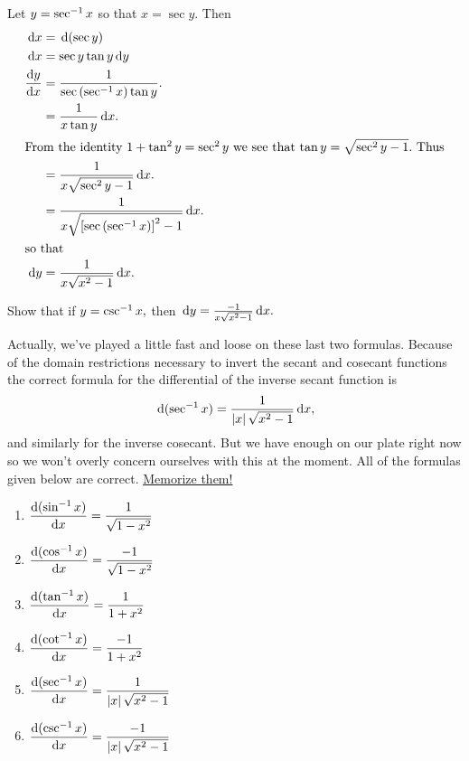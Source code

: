 Let $y=\sec^{-1} x$ so that $x=\sec y.$ Then
\begin{align*}
  \thinspace{\rm d}x &= \thinspace{\rm d}(\sec y)\\
  \thinspace{\rm d}x &= \sec y\tan y \thinspace{\rm d}y\\
  \frac{\text{d}{ y}}{\text{d}{x}}&= \frac{1}{\sec\left(\sec^{-1} x\right)\tan y}.\\
  &= \frac{1}{x\tan y}\thinspace{\rm d}x.\\
\intertext{From the identity $1+\tan^2y=\sec^2y$ we see that $\tan y =
  \sqrt{\sec^2y-1}.$ Thus}
  &= \frac{1}{x\sqrt{\sec^2y-1}}\thinspace{\rm d}x.\\
  &= \frac{1}{x\sqrt{\left[\sec\left( \sec^{-1} x\right)\right]^2-1}}\thinspace{\rm d}x.\\
\intertext{so that}
  \thinspace{\rm d}y &= \frac{1}{x\sqrt{x^2-1}}\thinspace{\rm d}x.
\end{align*}


\begin{embeddedproblem}{}
  Show that if $y=\csc^{-1} x,$ then  $\thinspace{\rm d}y = \frac{-1}{x\sqrt{x^2-1}}\thinspace{\rm d}x.$
\end{embeddedproblem}

Actually, we've played a little fast and loose on these last two
formulas. Because of the domain restrictions necessary to invert the
secant and cosecant functions the correct formula for the differential
of the inverse secant function is
\[
\thinspace{\rm d}(\sec^{-1} x) = \frac{1}{\left|x\right|\sqrt{x^2-1}} \thinspace{\rm d}x,
\]
and similarly for the inverse cosecant. But we have enough on our
plate right now so we won't overly concern ourselves with this at 
the moment. All of the formulas given below are correct.
\underline{\sc Memorize them!}
\begin{enumerate}
\item $\displaystyle\frac{\text{d}{ (\sin^{-1} x)}}{\text{d}{x}} =  \frac{1}{\sqrt{1-x^2}} $
\item $\displaystyle\frac{\text{d}{ (\cos^{-1} x)}}{\text{d}{x}} = \frac{-1}{\sqrt{1-x^2}}  $
\item $\displaystyle\frac{\text{d}{ (\tan^{-1} x)}}{\text{d}{x}} = \frac{1}{1+ x^2} $
\item $\displaystyle\frac{\text{d}{ (\cot^{-1} x)}}{\text{d}{x}} = \frac{-1}{1+ x^2}$
\item $\displaystyle\frac{\text{d}{ (\sec^{-1} x)}}{\text{d}{x}} = \frac{1}{\left|x\right|\sqrt{x^2-1}} $
\item $\displaystyle\frac{\text{d}{ (\csc^{-1} x)}}{\text{d}{x}} = \frac{-1}{\left|x\right|\sqrt{x^2-1}} $
\end{enumerate}



